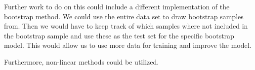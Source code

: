 

Further work to do on this could include a different implementation of the bootstrap method. We could use the entire data set to draw bootstrap samples from. Then we would have to keep track of which samples where not included in the bootstrap sample and use these as the test set for the specific bootstrap model. This would allow us to use more data for training and improve the model. 

Furthermore, non-linear methods could be utilized. 